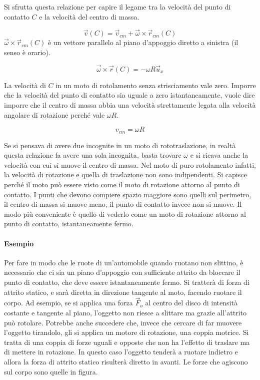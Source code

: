 Si sfrutta questa relazione per capire il legame tra la velocità del punto di contatto $C$ e la velocità del centro di massa.

\[
	\vec{v} (C) = \vec{v}_{cm} + \vec{\omega}\times \vec{r}_{cm}(C)
\]
$\vec{\omega}\times \vec{r}_{cm}(C)$ è un vettore parallelo al piano d'appoggio diretto a sinistra (il senso è orario).

\[
	\vec{\omega} \times \vec{r}(C) = -\omega R \vec{u}_x
\]

La velocità di $C$ in un moto di rotolamento senza strisciamento vale zero. Imporre che la velocità del punto di contatto sia uguale a zero istantaneamente, vuole dire imporre che il centro di massa abbia una velocità strettamente legata alla velocità angolare di rotazione perché vale $\omega R$.

\[
	\boxed{v_{cm} = \omega R}
\]

Se si pensava di avere due incognite in un moto di rototraslazione, in realtà questa relazione fa avere una sola incognita,  basta trovare $\omega$ e si ricava anche la velocità con cui si muove il centro di massa. Nel moto di puro rotolamento infatti, la velocità di rotazione e quella di traslazione non sono indipendenti.
Si capisce perché il moto può essere visto come il moto di rotazione attorno al punto di contatto. I punti che devono compiere spazio maggiore sono quelli sul perimetro, il centro di massa si muove meno, il punto di contatto invece non si muove. Il modo più conveniente è quello di vederlo come un moto di rotazione attorno al punto di contatto, istantaneamente fermo.

\paragraph{Esempio} Per fare in modo che le ruote di un'automobile quando ruotano non slittino, è necessario che ci sia un piano d'appoggio con sufficiente attrito da bloccare il punto di contatto, che deve essere istantaneamente fermo. Si tratterà di forza di attrito statico, e sarà diretta in direzione tangente al moto, facendo ruotare il corpo. Ad esempio, se si applica una forza $\vec{F}_o$ al centro del disco di intensità costante e tangente al piano, l'oggetto non riesce a slittare ma grazie all'attrito può rotolare. Potrebbe anche succedere che, invece che cercare di far muovere l'oggetto tirandolo, gli si applica un motore di rotazione, una coppia motrice. Si tratta di una coppia di forze uguali e opposte che non ha l'effetto di traslare ma di mettere in rotazione. In questo caso l'oggetto tenderà a ruotare indietro e allora la forza di attrito statico risulterà diretto in avanti. Le forze che agiscono sul corpo sono quelle
in figura.

